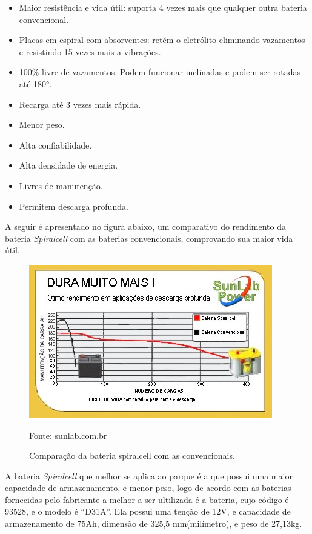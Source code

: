 \begin{enumerate}
	\begin{itemize}
	\item Maior resistência e vida útil: suporta 4 vezes mais que qualquer outra bateria convencional.
	\item Placas em espiral com absorventes: retém o eletrólito eliminando vazamentos e resistindo 15 vezes mais a vibrações.
	\item 100\% livre de vazamentos: Podem funcionar inclinadas e podem ser rotadas até 180°.
	\item Recarga até 3 vezes mais rápida.	
	\item Menor peso. 
	\item Alta confiabilidade.
	\item Alta densidade de energia.
	\item Livres de manutenção.
	\item Permitem descarga profunda.
	\end{itemize}

A seguir é apresentado no figura abaixo, um comparativo do rendimento da bateria \textit{Spiralcell} com as baterias convencionais, comprovando sua maior vida útil.

\begin{figure}[H]
	 \centering
	\label{Comparação da bateria spiralcell com as convencionais}
	 \includegraphics[keepaspectratio=true,scale=0.8]{postes/13.png}
	 \caption{Comparação da bateria spiralcell com as convencionais.}
	 \small{Fonte: sunlab.com.br}
\end{figure}

	A bateria \textit{Spiralcell} que melhor se aplica ao parque é a que possui uma maior capacidade de armazenamento, e menor peso, logo de acordo com as baterias fornecidas pelo fabricante a melhor a ser ultilizada é a bateria, cujo código é 93528, e o modelo é  “D31A”. Ela possui uma tenção de 12V, e capacidade de armazenamento de 75Ah, dimensão de 325,5 mm(milímetro), e peso de 27,13kg.



\end{enumerate}
